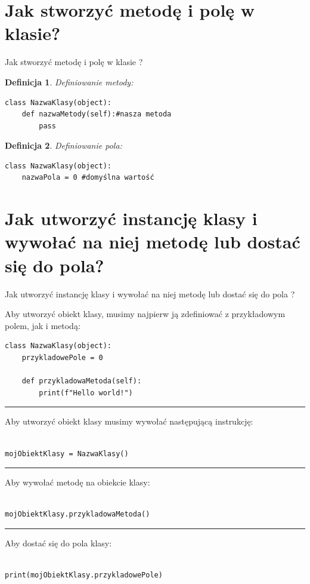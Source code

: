 \documentclass{beamer}
\newtheorem{twierdzenieBlok}{Definicja}
\begin{document}
\section{Jak stworzyć metodę i polę w klasie?}
\begin{frame}[fragile]{Jak stworzyć metodę i polę w klasie ?}
	\begin{twierdzenieBlok}
		\footnotesize Definiowanie metody:
  		\scriptsize
		\begin{verbatim}
class NazwaKlasy(object):
	def nazwaMetody(self):#nasza metoda
		pass	
		\end{verbatim}
	\end{twierdzenieBlok}

	\begin{twierdzenieBlok}
		\footnotesize Definiowanie pola:
  		\scriptsize
		\begin{verbatim}
class NazwaKlasy(object):
	nazwaPola = 0 #domyślna wartość	
		\end{verbatim}
	\end{twierdzenieBlok}
\end{frame}

\section{Jak utworzyć instancję klasy i wywołać na niej metodę lub dostać się do pola?}
\begin{frame}[fragile]{Jak utworzyć instancję klasy i wywołać na niej metodę lub dostać się do pola ?}

			\scriptsize
			\tiny Aby utworzyć obiekt klasy, musimy najpierw ją zdefiniować z przykładowym polem, jak i metodą: 
			\begin{verbatim}
class NazwaKlasy(object):
	przykladowePole = 0
	
	def przykladowaMetoda(self):
		print(f"Hello world!")

			\end{verbatim}
			
			\rule{\textwidth}{1pt}

			Aby utworzyć obiekt klasy musimy wywołać następującą instrukcję:
			\begin{verbatim}

mojObiektKlasy = NazwaKlasy()

			\end{verbatim}

			\rule{\textwidth}{1pt}

			Aby wywołać metodę na obiekcie klasy:
			\begin{verbatim}

mojObiektKlasy.przykladowaMetoda()

			\end{verbatim}

			\rule{\textwidth}{1pt}

			Aby dostać się do pola klasy:
			\begin{verbatim}

print(mojObiektKlasy.przykladowePole)

			\end{verbatim}
	
\end{frame}
\end{document}
